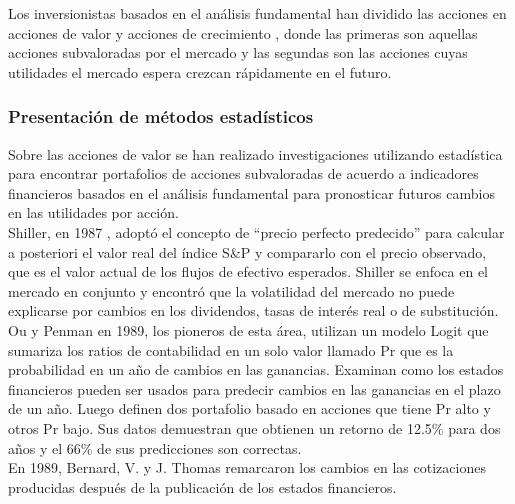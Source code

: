 Los inversionistas basados en el an\'alisis fundamental han dividido las acciones en acciones de valor y acciones de crecimiento \cite{Piotroski2000} \cite{Preeti2009}, donde las primeras son aquellas acciones subvaloradas por el mercado y las segundas son las acciones cuyas utilidades el mercado espera crezcan r\'apidamente en el futuro.\\

\subsubsection{Presentaci\'on de m\'etodos estad\'isticos}

Sobre las acciones de valor se han realizado investigaciones utilizando estad\'istica para encontrar portafolios de acciones subvaloradas de acuerdo a indicadores financieros basados en el an\'alisis fundamental para pronosticar futuros cambios en las utilidades por acción.\\

Shiller, en 1987 \cite{Shiller1987}, adoptó el concepto de “precio perfecto predecido” para calcular a posteriori el valor real del índice S\&P y compararlo con el precio observado, que es el valor actual de los flujos de efectivo esperados. Shiller se enfoca en el mercado en conjunto y encontró que la volatilidad del mercado no puede explicarse por cambios en los dividendos, tasas de interés real o de substitución.\\

Ou y Penman \cite{Ou1989} en 1989, los pioneros de esta área, utilizan un modelo Logit que sumariza los ratios de contabilidad en un solo valor llamado Pr que es la probabilidad en un año de cambios en las ganancias. Examinan como los estados financieros pueden ser usados para predecir cambios en las ganancias en el plazo de un año. Luego definen dos portafolio basado en acciones que tiene Pr alto y otros Pr bajo. Sus datos demuestran que obtienen un retorno de 12.5\%  para dos años y el 66\% de sus predicciones son correctas. \\

En 1989, Bernard, V. y J. Thomas \cite{Bernard1989} remarcaron los cambios en las cotizaciones producidas después de la publicación de los estados financieros.\\

